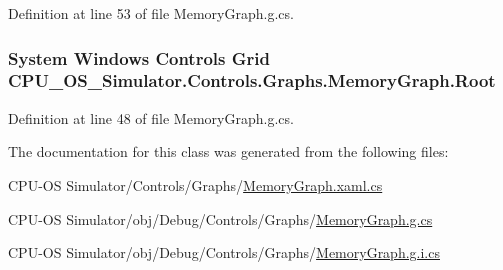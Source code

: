 Definition at line 53 of file Memory\+Graph.\+g.\+cs.

\hypertarget{class_c_p_u___o_s___simulator_1_1_controls_1_1_graphs_1_1_memory_graph_a8d150d903f462523d77188c9a04ea5c3}{}
\subsubsection[{Root}]{\setlength{\rightskip}{0pt plus 5cm}System Windows Controls Grid C\+P\+U\+\_\+\+O\+S\+\_\+\+Simulator.\+Controls.\+Graphs.\+Memory\+Graph.\+Root\hspace{0.3cm}{\ttfamily [package]}}\label{class_c_p_u___o_s___simulator_1_1_controls_1_1_graphs_1_1_memory_graph_a8d150d903f462523d77188c9a04ea5c3}


Definition at line 48 of file Memory\+Graph.\+g.\+cs.



The documentation for this class was generated from the following files\+:\begin{DoxyCompactItemize}
\item 
C\+P\+U-\/\+O\+S Simulator/\+Controls/\+Graphs/\hyperlink{_memory_graph_8xaml_8cs}{Memory\+Graph.\+xaml.\+cs}\item 
C\+P\+U-\/\+O\+S Simulator/obj/\+Debug/\+Controls/\+Graphs/\hyperlink{_memory_graph_8g_8cs}{Memory\+Graph.\+g.\+cs}\item 
C\+P\+U-\/\+O\+S Simulator/obj/\+Debug/\+Controls/\+Graphs/\hyperlink{_graphs_2_memory_graph_8g_8i_8cs}{Memory\+Graph.\+g.\+i.\+cs}\end{DoxyCompactItemize}
